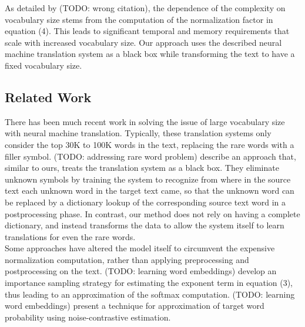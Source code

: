 As detailed by  (TODO: wrong citation), the dependence of the complexity on vocabulary
size stems from the computation of the normalization factor in equation (4). This leads
to significant temporal and memory requirements that scale with increased vocabulary size. Our approach uses the described neural machine
translation system as a black box while transforming the text to have a fixed vocabulary size.

\subsection{Related Work}
There has been much recent work in solving the issue of large vocabulary size with neural machine translation.
Typically, these translation systems only consider the top 30K to 100K words in the text, replacing the rare words
with a filler symbol.  (TODO: addressing rare word problem) describe an approach
that, similar to ours, treats the translation system as a black box. They eliminate unknown symbols by training the
system to recognize from where in the source text each unknown word in the target text came, so that the unknown word
can be replaced by a dictionary lookup of the corresponding source text word in a postprocessing phase. In contrast,
our method does not rely on having a complete dictionary, and instead transforms the data to allow the system itself to
learn translations for even the rare words.\\

Some approaches have altered the model itself to circumvent the expensive normalization computation, rather than
applying preprocessing and postprocessing on the text.  (TODO: learning word embeddings)
develop an importance sampling strategy for estimating the exponent term in equation (3), thus leading to
an approximation of the softmax computation.  (TODO: learning word embeddings)
present a technique for approximation of target word probability using noise-contrastive estimation.